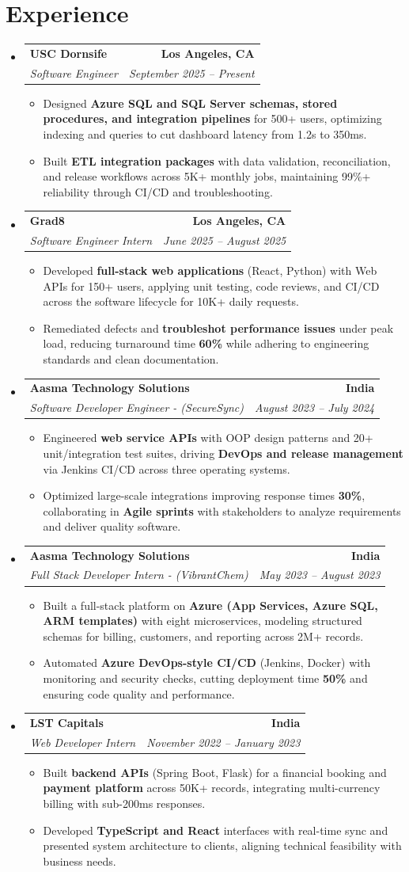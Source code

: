\documentclass[letterpaper,10pt]{article}
\makeatletter
\newcommand{\resumeItem}[1]{\item\small{{#1 \vspace{-2pt}}}}
\newcommand{\resumeSubheading}[4]{\vspace{-1pt}\item\begin{tabular*}{1.0\textwidth}[t]{l@{\extracolsep{\fill}}r}\textbf{#1} & \textbf{\small #2} \\\textit{\small#3} & \textit{\small #4} \\\end{tabular*}\vspace{-2pt}}
\newcommand{\resumeSubHeadingListStart}{\begin{itemize}[leftmargin=0.0in, label={}]}
\newcommand{\resumeSubHeadingListEnd}{\end{itemize}}
\newcommand{\resumeItemListStart}{\begin{itemize}[leftmargin=0.15in,label=\textbullet,itemsep=2pt,topsep=0pt,parsep=0pt,partopsep=0pt]}
\newcommand{\resumeItemListEnd}{\end{itemize}\vspace{-4pt}}
\makeatother
\begin{document}
\section{Experience}
\resumeSubHeadingListStart
\resumeSubheading{USC Dornsife}{Los Angeles, CA}{Software Engineer}{September 2025 -- Present}
\resumeItemListStart
\resumeItem{Designed \textbf{Azure SQL and SQL Server schemas, stored procedures, and integration pipelines} for 500+ users, optimizing indexing and queries to cut dashboard latency from 1.2s to 350ms.}
\resumeItem{Built \textbf{ETL integration packages} with data validation, reconciliation, and release workflows across 5K+ monthly jobs, maintaining 99\%+ reliability through CI/CD and troubleshooting.}
\resumeItemListEnd
\resumeSubheading{Grad8}{Los Angeles, CA}{Software Engineer Intern}{June 2025 -- August 2025}
\resumeItemListStart
\resumeItem{Developed \textbf{full-stack web applications} (React, Python) with Web APIs for 150+ users, applying unit testing, code reviews, and CI/CD across the software lifecycle for 10K+ daily requests.}
\resumeItem{Remediated defects and \textbf{troubleshot performance issues} under peak load, reducing turnaround time \textbf{60\%} while adhering to engineering standards and clean documentation.}
\resumeItemListEnd
\resumeSubheading{Aasma Technology Solutions}{India}{Software Developer Engineer - (SecureSync)}{August 2023 -- July 2024}
\resumeItemListStart
\resumeItem{Engineered \textbf{web service APIs} with OOP design patterns and 20+ unit/integration test suites, driving \textbf{DevOps and release management} via Jenkins CI/CD across three operating systems.}
\resumeItem{Optimized large-scale integrations improving response times \textbf{30\%}, collaborating in \textbf{Agile sprints} with stakeholders to analyze requirements and deliver quality software.}
\resumeItemListEnd
\resumeSubheading{Aasma Technology Solutions}{India}{Full Stack Developer Intern - (VibrantChem)}{May 2023 -- August 2023}
\resumeItemListStart
\resumeItem{Built a full-stack platform on \textbf{Azure (App Services, Azure SQL, ARM templates)} with eight microservices, modeling structured schemas for billing, customers, and reporting across 2M+ records.}
\resumeItem{Automated \textbf{Azure DevOps-style CI/CD} (Jenkins, Docker) with monitoring and security checks, cutting deployment time \textbf{50\%} and ensuring code quality and performance.}
\resumeItemListEnd
\resumeSubheading{LST Capitals}{India}{Web Developer Intern}{November 2022 -- January 2023}
\resumeItemListStart
\resumeItem{Built \textbf{backend APIs} (Spring Boot, Flask) for a financial booking and \textbf{payment platform} across 50K+ records, integrating multi-currency billing with sub-200ms responses.}
\resumeItem{Developed \textbf{TypeScript and React} interfaces with real-time sync and presented system architecture to clients, aligning technical feasibility with business needs.}
\resumeItemListEnd
\resumeSubHeadingListEnd
\vspace{-6pt}
\end{document}
